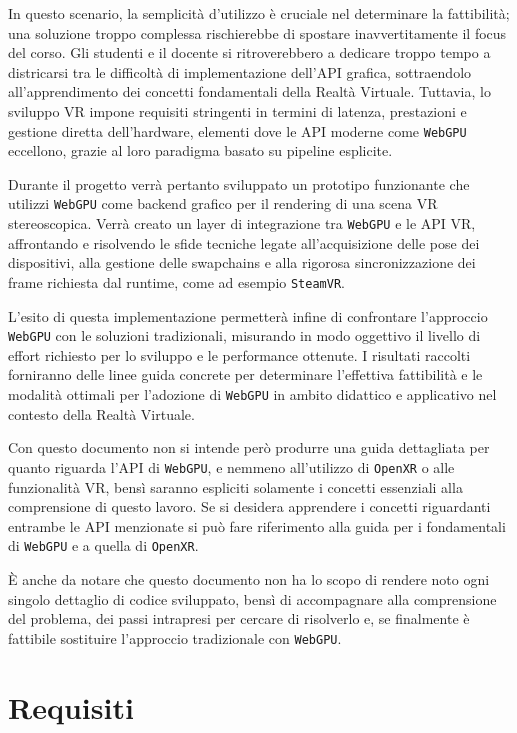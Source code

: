 \documentclass[a4paper, 11pt, twoside]{report}
\begin{document}
In questo scenario, la semplicità d'utilizzo è cruciale nel determinare la fattibilità; una soluzione troppo complessa
rischierebbe di spostare inavvertitamente il focus del corso. Gli studenti e il docente si ritroverebbero a dedicare
troppo tempo a districarsi tra le difficoltà di implementazione dell'API grafica, sottraendolo all'apprendimento
dei concetti fondamentali della Realtà Virtuale. Tuttavia, lo sviluppo VR impone requisiti stringenti in termini di
latenza, prestazioni e gestione diretta dell'hardware, elementi dove le API moderne come \texttt{WebGPU} eccellono,
grazie al loro paradigma basato su pipeline esplicite.

Durante il progetto verrà pertanto sviluppato un prototipo funzionante che utilizzi \texttt{WebGPU} come backend grafico
per il rendering di una scena VR stereoscopica. Verrà creato un layer di integrazione tra \texttt{WebGPU} e le API VR,
affrontando e risolvendo le sfide tecniche legate all'acquisizione delle pose dei dispositivi, alla gestione delle
swapchains e alla rigorosa sincronizzazione dei frame richiesta dal runtime, come ad esempio \texttt{SteamVR}.

L'esito di questa implementazione permetterà infine di confrontare l'approccio \texttt{WebGPU} con le soluzioni
tradizionali, misurando in modo oggettivo il livello di effort richiesto per lo sviluppo e le performance ottenute.
I risultati raccolti forniranno delle linee guida concrete per determinare l'effettiva fattibilità e le
modalità ottimali per l'adozione di \texttt{WebGPU} in ambito didattico e applicativo nel contesto della Realtà
Virtuale.

Con questo documento non si intende però produrre una guida dettagliata per quanto riguarda l'API di \texttt{WebGPU},
e nemmeno all'utilizzo di \texttt{\gls{OpenXR}} o alle funzionalità VR, bensì saranno espliciti solamente i concetti
essenziali alla comprensione di questo lavoro. Se si desidera apprendere i concetti riguardanti entrambe le API
menzionate si può fare riferimento alla guida per i fondamentali di \texttt{WebGPU} \cite{webgpu-webgl} e a
quella di \texttt{\gls{OpenXR}}.

È anche da notare che questo documento non ha lo scopo di rendere noto ogni singolo dettaglio di codice sviluppato,
bensì di accompagnare alla comprensione del problema, dei passi intrapresi per cercare di risolverlo e, se finalmente
è fattibile sostituire l'approccio tradizionale con \texttt{WebGPU}.

\section{Requisiti}
\end{document}
